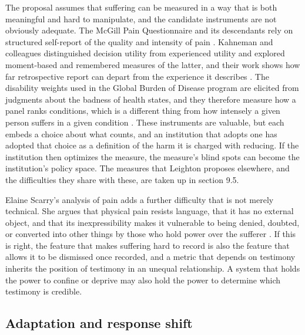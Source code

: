 \documentclass[11pt]{article}
\begin{document}
The proposal assumes that suffering can be measured in a way that is both meaningful and hard to manipulate, and the candidate instruments are not obviously adequate. The McGill Pain Questionnaire and its descendants rely on structured self-report of the quality and intensity of pain \citep{melzack1975}. Kahneman and colleagues distinguished decision utility from experienced utility and explored moment-based and remembered measures of the latter, and their work shows how far retrospective report can depart from the experience it describes \citep{kahneman1997}. The disability weights used in the Global Burden of Disease program are elicited from judgments about the badness of health states, and they therefore measure how a panel ranks conditions, which is a different thing from how intensely a given person suffers in a given condition \citep{murray1996}. These instruments are valuable, but each embeds a choice about what counts, and an institution that adopts one has adopted that choice as a definition of the harm it is charged with reducing. If the institution then optimizes the measure, the measure's blind spots can become the institution's policy space. The measures that Leighton proposes elsewhere, and the difficulties they share with these, are taken up in section 9.5.

Elaine Scarry's analysis of pain adds a further difficulty that is not merely technical. She argues that physical pain resists language, that it has no external object, and that its inexpressibility makes it vulnerable to being denied, doubted, or converted into other things by those who hold power over the sufferer \citep{scarry1985}. If this is right, the feature that makes suffering hard to record is also the feature that allows it to be dismissed once recorded, and a metric that depends on testimony inherits the position of testimony in an unequal relationship. A system that holds the power to confine or deprive may also hold the power to determine which testimony is credible.

\subsection{Adaptation and response shift}
\end{document}
